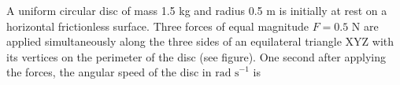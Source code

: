 

    \item A uniform circular disc of mass 1.5 kg and radius 0.5 m is initially at rest on a horizontal frictionless surface. Three forces of equal magnitude $F = 0.5$ N are applied simultaneously along the three sides of an equilateral triangle XYZ with its vertices on the perimeter of the disc (see figure). One second after applying the forces, the angular speed of the disc in $\text{rad s}^{-1}$ is \underline{\hspace{2.5 cm}}
        \begin{center}
        \end{center}

